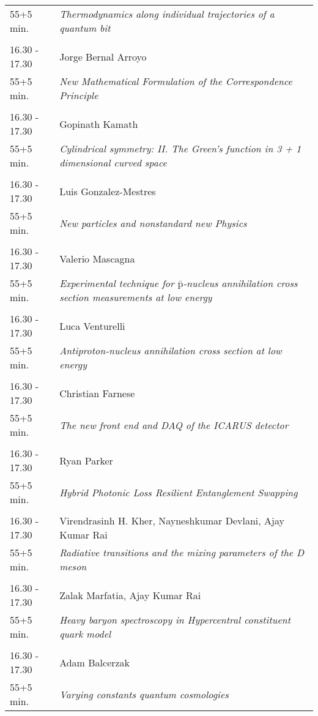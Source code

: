 \begin{longtable}{p{3cm}p{13cm}}
55+5 min. & {\it Thermodynamics along individual trajectories of a quantum bit}\\ 
 & \\ 
16.30 - 17.30 & Jorge Bernal Arroyo\\ 
55+5 min. & {\it New Mathematical Formulation of the Correspondence Principle}\\ 
 & \\ 
16.30 - 17.30 & Gopinath Kamath\\ 
55+5 min. & {\it Cylindrical symmetry: II. The Green’s function in 3 + 1 dimensional curved space}\\ 
 & \\ 
16.30 - 17.30 & Luis Gonzalez-Mestres\\ 
55+5 min. & {\it New particles and nonstandard new Physics}\\ 
 & \\ 
16.30 - 17.30 & Valerio Mascagna\\ 
55+5 min. & {\it Experimental technique for $\mathrm{\bar{p}}$-nucleus annihilation cross section measurements at low energy}\\ 
 & \\ 
16.30 - 17.30 & Luca Venturelli\\ 
55+5 min. & {\it Antiproton-nucleus annihilation cross section at low energy}\\ 
 & \\ 
16.30 - 17.30 & Christian Farnese\\ 
55+5 min. & {\it The new front end and DAQ of the ICARUS detector}\\ 
 & \\ 
16.30 - 17.30 & Ryan Parker\\ 
55+5 min. & {\it Hybrid Photonic Loss Resilient Entanglement Swapping}\\ 
 & \\ 
16.30 - 17.30 & Virendrasinh H. Kher, Nayneshkumar Devlani, Ajay Kumar Rai\\ 
55+5 min. & {\it Radiative transitions and the mixing parameters of the D meson}\\ 
 & \\ 
16.30 - 17.30 & Zalak Marfatia, Ajay Kumar Rai\\ 
55+5 min. & {\it Heavy baryon spectroscopy in Hypercentral constituent quark model}\\ 
 & \\ 
16.30 - 17.30 & Adam Balcerzak\\ 
55+5 min. & {\it Varying constants quantum cosmologies}\\ 

\end{longtable}
